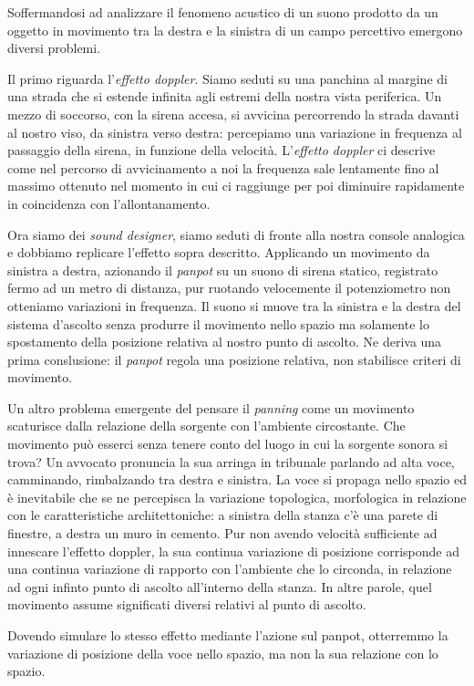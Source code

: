 Soffermandosi ad analizzare il fenomeno acustico di un suono prodotto da un
oggetto in movimento tra la destra e la sinistra di un campo percettivo emergono
diversi problemi.

Il primo riguarda l'\emph{effetto doppler}. Siamo seduti su una panchina al
margine di una strada che si estende infinita agli estremi della nostra vista
periferica. Un mezzo di soccorso, con la sirena accesa, si avvicina percorrendo
la strada davanti al nostro viso, da sinistra verso destra: percepiamo
una variazione in frequenza al passaggio della sirena, in funzione della
velocità. L'\emph{effetto doppler} ci descrive come nel percorso di
avvicinamento a noi la frequenza sale lentamente fino al massimo ottenuto nel
momento in cui ci raggiunge per poi diminuire rapidamente in coincidenza con
l'allontanamento.

Ora siamo dei \emph{sound designer}, siamo seduti di fronte alla nostra console
analogica e dobbiamo replicare l'effetto sopra descritto. Applicando un
movimento da sinistra a destra, azionando il \emph{panpot} su un suono di sirena
statico, registrato fermo ad un metro di distanza, pur ruotando velocemente il
potenziometro non otteniamo variazioni in frequenza. Il suono si muove tra la
sinistra e la destra del sistema d'ascolto senza produrre il movimento nello
spazio ma solamente lo spostamento della posizione relativa al nostro punto di
ascolto. Ne deriva una prima conslusione: il \emph{panpot} regola una posizione
relativa, non stabilisce criteri di movimento.

Un altro problema emergente del pensare il \emph{panning} come un movimento
scaturisce dalla relazione della sorgente con l'ambiente circostante. Che
movimento può esserci senza tenere conto del luogo in cui la sorgente sonora si
trova? Un avvocato pronuncia la sua arringa in tribunale parlando ad alta voce,
camminando, rimbalzando tra destra e sinistra. La voce si propaga nello spazio
ed è inevitabile che se ne percepisca la variazione topologica, morfologica in
relazione con le caratteristiche architettoniche: a sinistra della stanza c'è
una parete di finestre, a destra un muro in cemento. Pur non avendo velocità
sufficiente ad innescare l'effetto doppler, la sua continua variazione di
posizione corrisponde ad una continua variazione di rapporto con l'ambiente che
lo circonda, in relazione ad ogni infinto punto di ascolto all'interno della
stanza. In altre parole, quel movimento assume significati diversi relativi al
punto di ascolto.

Dovendo simulare lo stesso effetto mediante l'azione sul panpot, otterremmo la
variazione di posizione della voce nello spazio, ma non la sua relazione con lo
spazio.

